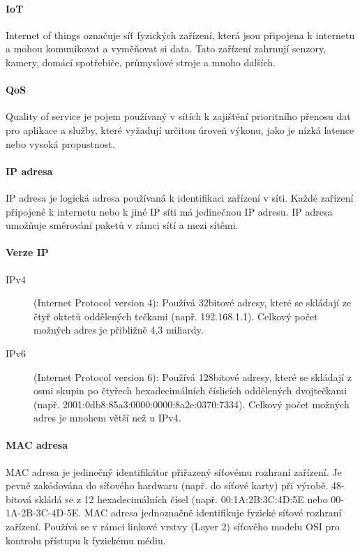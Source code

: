 \paragraph{IoT}
Internet of things označuje síť fyzických zařízení, která jsou připojena k internetu a mohou komunikovat a vyměňovat si data. Tato zařízení zahrnují senzory, kamery, domácí spotřebiče, průmyslové stroje a mnoho dalších.
\paragraph{QoS}
Quality of service je pojem používaný v sítích k zajištění prioritního přenosu dat pro aplikace a služby, které vyžadují určitou úroveň výkonu, jako je nízká latence nebo vysoká propustnost.

\paragraph{IP adresa}
IP adresa je logická adresa používaná k identifikaci zařízení v síti. Každé zařízení připojené k internetu nebo k jiné IP síti má jedinečnou IP adresu. IP adresa umožňuje směrování paketů v rámci sítí a mezi sítěmi.

\paragraph{Verze IP}
\begin{description}
    \item[IPv4] (Internet Protocol version 4): Používá 32bitové adresy, které se skládají ze čtyř oktetů oddělených tečkami (např. 192.168.1.1). Celkový počet možných adres je přibližně 4,3 miliardy.
    \item[IPv6] (Internet Protocol version 6): Používá 128bitové adresy, které se skládají z osmi skupin po čtyřech hexadecimálních číslicích oddělených dvojtečkami (např. 2001:0db8:85a3:0000:0000:8a2e:0370:7334). Celkový počet možných adres je mnohem větší než u IPv4.
\end{description}

\paragraph{MAC adresa}
MAC adresa je jedinečný identifikátor přiřazený síťovému rozhraní zařízení. Je pevně zakódována do síťového hardwaru (např. do síťové karty) při výrobě. 48-bitová skládá se z 12 hexadecimálních čísel (např. 00:1A:2B:3C:4D:5E nebo 00-1A-2B-3C-4D-5E. MAC adresa jednoznačně identifikuje fyzické síťové rozhraní zařízení. Používá se v rámci linkové vrstvy (Layer 2) síťového modelu OSI pro kontrolu přístupu k fyzickému médiu.

